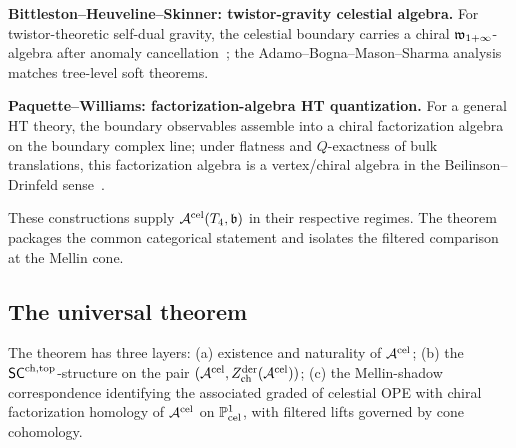\medskip
\noindent\textbf{Bittleston--Heuveline--Skinner: twistor-gravity
celestial algebra.} For twistor-theoretic self-dual gravity, the
celestial boundary carries a chiral $\mathfrak w_{1+\infty}$-algebra after anomaly
cancellation~\cite{BittlestonHeuvelineSkinner}; the
Adamo--Bogna--Mason--Sharma analysis~\cite{AdamoMasonSharmaCelestial}
matches tree-level soft theorems.

\medskip
\noindent\textbf{Paquette--Williams: factorization-algebra HT
quantization.} For a general HT theory, the boundary observables
assemble into a chiral factorization algebra on the boundary complex
line; under flatness and $Q$-exactness of bulk translations, this
factorization algebra is a vertex/chiral algebra
in the Beilinson--Drinfeld sense~\cite{PaquetteWilliamsHT,
GwilliamWilliams25, WangWilliams24}.

\medskip
These constructions supply $\mathcal A^{\mathrm{cel}}(T_4,\mathfrak b)$ in
their respective regimes. The theorem packages the common categorical
statement and isolates the filtered comparison at the Mellin cone.

\subsection{The universal theorem}
\label{subsec:uch-theorem}

The theorem has three layers:
(a) existence and naturality of $\mathcal A^{\mathrm{cel}}$;
(b) the $\mathsf{SC}^{\mathrm{ch,top}}$-structure on the pair
$(\mathcal A^{\mathrm{cel}}, Z^{\mathrm{der}}_{\mathrm{ch}}(\mathcal A^{\mathrm{cel}}))$;
(c) the Mellin-shadow correspondence identifying the associated graded
of celestial OPE with chiral factorization homology of
$\mathcal A^{\mathrm{cel}}$ on $\mathbb P^1_{\text{cel}}$, with filtered lifts
governed by cone cohomology.

